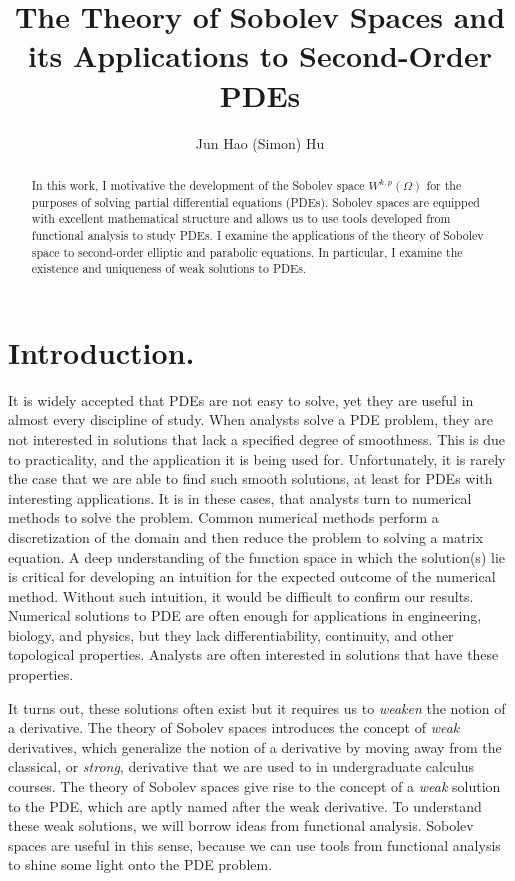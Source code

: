 \documentclass[11pt]{amsart}
\title{The Theory of Sobolev Spaces and its Applications to Second-Order PDEs}
\author{Jun Hao (Simon) Hu}
\theoremstyle{plain}
\theoremstyle{definition}
\theoremstyle{remark}
\numberwithin{theorem}{section}
\numberwithin{proposition}{section}
\numberwithin{remark}{section}
\numberwithin{corollary}{section}
\numberwithin{definition}{section}
\numberwithin{lemma}{section}
\numberwithin{equation}{section}
\begin{document}
\maketitle

\begin{abstract}
	In this work, I motivative the development of the Sobolev space $W^{k,p}(\Omega)$ for the purposes of solving partial differential equations (PDEs). Sobolev spaces are equipped with excellent mathematical structure and allows us to use tools developed from functional analysis to study PDEs. I examine the applications of the theory of Sobolev space to second-order elliptic and parabolic equations. In particular, I examine the existence and uniqueness of weak solutions to PDEs. 
\end{abstract}

\section{Introduction.}
It is widely accepted that PDEs are not easy to solve, yet they are useful in almost every discipline of study. When analysts solve a PDE problem, they are not interested in solutions that lack a specified degree of smoothness. This is due to practicality, and the application it is being used for. Unfortunately, it is rarely the case that we are able to find such smooth solutions, at least for PDEs with interesting applications. It is in these cases, that analysts turn to numerical methods to solve the problem. Common numerical methods perform a discretization of the domain and then reduce the problem to solving a matrix equation. A deep understanding of the function space in which the solution(s) lie is critical for developing an intuition for the expected outcome of the numerical method. Without such intuition, it would be difficult to confirm our results. Numerical solutions to PDE are often enough for applications in engineering, biology, and physics, but they lack differentiability, continuity, and other topological properties. Analysts are often interested in solutions that have these properties. 

It turns out, these solutions often exist but it requires us to \textit{weaken} the notion of a derivative. The theory of Sobolev spaces introduces the concept of \textit{weak} derivatives, which generalize the notion of a derivative by moving away from the classical, or \textit{strong}, derivative that we are used to in undergraduate calculus courses. The theory of Sobolev spaces give rise to the concept of a \textit{weak} solution to the PDE, which are aptly named after the weak derivative. To understand these weak solutions, we will borrow ideas from functional analysis. Sobolev spaces are useful in this sense, because we can use tools from functional analysis to shine some light onto the PDE problem. 
\end{document}
